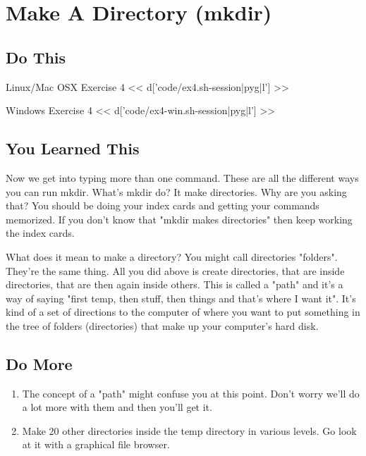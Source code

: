 \chapter{Make A Directory (mkdir)}

\section{Do This}

\begin{code}{Linux/Mac OSX Exercise 4}
<< d['code/ex4.sh-session|pyg|l'] >>
\end{code}

\begin{code}{Windows Exercise 4}
<< d['code/ex4-win.sh-session|pyg|l'] >>
\end{code}

\section{You Learned This}

Now we get into typing more than one command.  These are all the different ways
you can run mkdir.  What's mkdir do?  It make directories.  Why are you asking
that?  You should be doing your index cards and getting your commands memorized.
If you don't know that "mkdir makes directories" then keep working the index
cards.

What does it mean to make a directory?  You might call directories "folders".  They're
the same thing.  All you did above is create directories, that are inside directories,
that are then again inside others.  This is called a "path" and it's a way of saying
"first temp, then stuff, then things and that's where I want it".  It's kind of a
set of directions to the computer of where you want to put something in the tree
of folders (directories) that make up your computer's hard disk.

\section{Do More}

\begin{enumerate}
\item The concept of a "path" might confuse you at this point.  Don't worry we'll 
    do a lot more with them and then you'll get it.
\item Make 20 other directories inside the temp directory in various levels.  Go look at it
    with a graphical file browser.
\end{enumerate}

